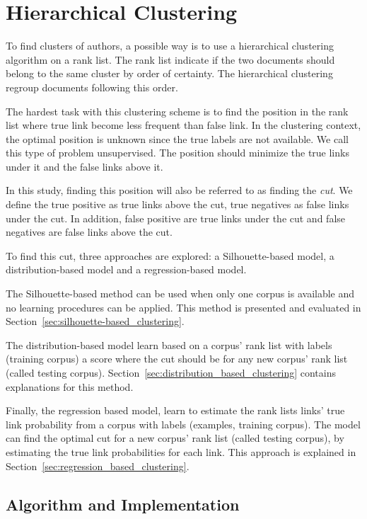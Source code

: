 \section{Hierarchical Clustering \label{sec:authorship_clustering_methods}}

To find clusters of authors, a possible way is to use a hierarchical clustering algorithm on a rank list.
The rank list indicate if the two documents should belong to the same cluster by order of certainty.
The hierarchical clustering regroup documents following this order.

The hardest task with this clustering scheme is to find the position in the rank list where true link become less frequent than false link.
In the clustering context, the optimal position is unknown since the true labels are not available.
We call this type of problem unsupervised.
The position should minimize the true links under it and the false links above it.

In this study, finding this position will also be referred to as finding the \textit{cut}.
We define the true positive as true links above the cut, true negatives as false links under the cut.
In addition, false positive are true links under the cut and false negatives are false links above the cut.

To find this cut, three approaches are explored: a Silhouette-based model, a distribution-based model and a regression-based model.

The Silhouette-based method can be used when only one corpus is available and no learning procedures can be applied.
This method is presented and evaluated in Section~\ref{sec:silhouette-based_clustering}.

The distribution-based model learn based on a corpus' rank list with labels (training corpus) a score where the cut should be for any new corpus' rank list (called testing corpus).
Section~\ref{sec:distribution_based_clustering} contains explanations for this method.

Finally, the regression based model, learn to estimate the rank lists links' true link probability from a corpus with labels (examples, training corpus).
The model can find the optimal cut for a new corpus' rank list (called testing corpus), by estimating the true link probabilities for each link.
This approach is explained in Section~\ref{sec:regression_based_clustering}.

\subsection{Algorithm and Implementation \label{sec:algorithm_and_implementation}}

